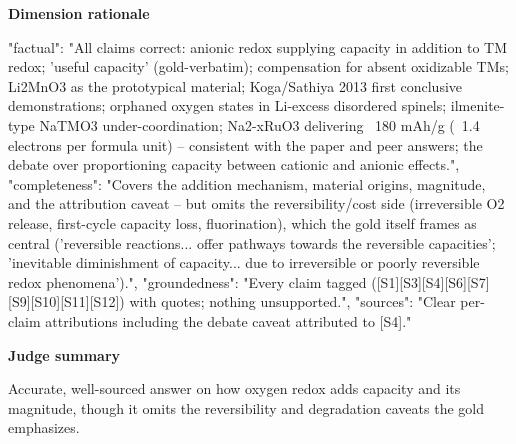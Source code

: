 \documentclass[10pt]{article}
\begin{document}
\textbf{Dimension rationale}
\begin{EvidenceText}
{
  "factual": "All claims correct: anionic redox supplying capacity in addition to TM redox; 'useful capacity' (gold-verbatim); compensation for absent oxidizable TMs; Li2MnO3 as the prototypical material; Koga/Sathiya 2013 first conclusive demonstrations; orphaned oxygen states in Li-excess disordered spinels; ilmenite-type NaTMO3 under-coordination; Na2-xRuO3 delivering ~180 mAh/g (~1.4 electrons per formula unit) -- consistent with the paper and peer answers; the debate over proportioning capacity between cationic and anionic effects.",
  "completeness": "Covers the addition mechanism, material origins, magnitude, and the attribution caveat -- but omits the reversibility/cost side (irreversible O2 release, first-cycle capacity loss, fluorination), which the gold itself frames as central ('reversible reactions... offer pathways towards the reversible capacities'; 'inevitable diminishment of capacity... due to irreversible or poorly reversible redox phenomena').",
  "groundedness": "Every claim tagged ([S1][S3][S4][S6][S7][S9][S10][S11][S12]) with quotes; nothing unsupported.",
  "sources": "Clear per-claim attributions including the debate caveat attributed to [S4]."
}
\end{EvidenceText}

\textbf{Judge summary}
\begin{EvidenceText}
Accurate, well-sourced answer on how oxygen redox adds capacity and its magnitude, though it omits the reversibility and degradation caveats the gold emphasizes.
\end{EvidenceText}
\end{document}

